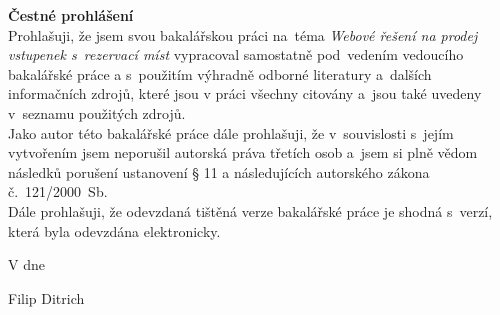 \newpage
\pagestyle{empty}

\noindent
{\large\bfseries Čestné prohlášení}\\

\noindent
Prohlašuji, že jsem svou bakalářskou práci na~téma \textit{Webové řešení na prodej vstupenek s~rezervací míst}
vypracoval samostatně pod~vedením vedoucího bakalářské práce a s~použitím výhradně odborné literatury
a~dalších informačních zdrojů, které jsou v práci všechny citovány a~jsou také uvedeny v~seznamu použitých zdrojů.\\

\noindent
Jako autor této bakalářské práce dále prohlašuji, že v~souvislosti s~jejím vytvořením jsem neporušil autorská práva
třetích osob a~jsem si plně vědom následků porušení ustanovení § 11 a následujících autorského zákona č.~121/2000~Sb.\\

\noindent
Dále prohlašuji, že odevzdaná tištěná verze bakalářské práce je shodná s~verzí, která byla odevzdána elektronicky.

\vspace{18mm}
\noindent
V \makebox[4cm]{\dotfill} dne \makebox[2.5cm]{\dotfill}
\hspace*{\fill}
\makebox[4cm]{\dotfill}

\begin{flushright}
    \noindent
    Filip Ditrich
\end{flushright}
